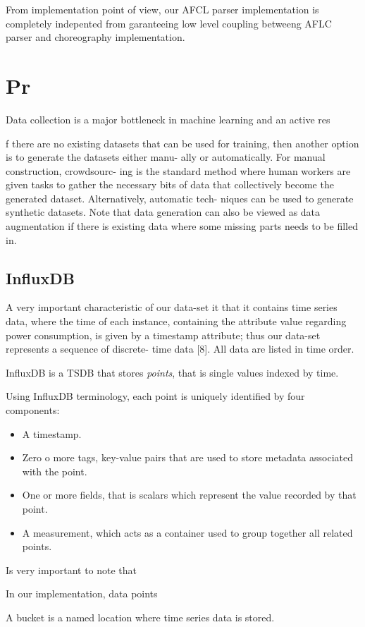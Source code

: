 \documentclass[12pt,a4paper]{report}
\begin{document}
From implementation point of view, our AFCL parser implementation is completely indepented from 
garanteeing low level coupling betweeng AFLC parser and choreography implementation.



\section{Pr}

Data collection is a major bottleneck in machine learning and an active res


f there are no existing datasets that can be used for training,
then another option is to generate the datasets either manu-
ally or automatically. For manual construction, crowdsourc-
ing is the standard method where human workers are given
tasks to gather the necessary bits of data that collectively
become the generated dataset. Alternatively, automatic tech-
niques can be used to generate synthetic datasets. Note that
data generation can also be viewed as data augmentation if
there is existing data where some missing parts needs to be
filled in.

\subsection{InfluxDB}

A very important characteristic of our data-set it that it contains time series data, where the time of each instance, containing the attribute value regarding power consumption, is given by a timestamp attribute; thus our data-set represents a sequence of discrete-
time data [8]. All data are listed in time order.


InfluxDB is a TSDB that stores \textit{points}, that is single values indexed by time. 

Using InfluxDB terminology, each point is uniquely identified by four components:

\begin{itemize}
	\item A timestamp.
	
	\item Zero o more tags, key-value pairs that are used to store metadata associated with the point. 
	 
	\item One or more fields, that is scalars which represent the value recorded by that point.
	
	\item A measurement, which acts as a container used to group together all related points.
	
\end{itemize}

Is very important to note that  

In our implementation, data points 

A bucket is a named location where time series data is stored.







\end{document}
